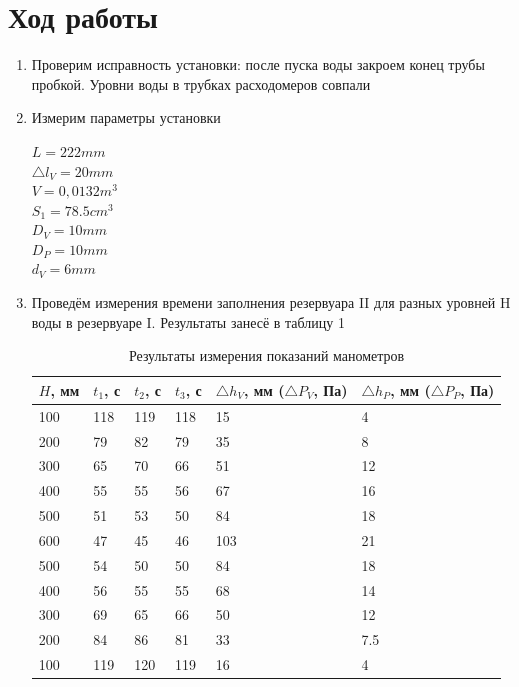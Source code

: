 \documentclass{article}
\begin{document}
\section{Ход работы}
\begin{enumerate}
\item Проверим исправность установки: после пуска воды закроем конец трубы пробкой. Уровни воды в трубках расходомеров совпали
\item Измерим параметры установки
\begin{multicols}{3}
$L = 222 mm$\\
$\triangle l{}_V{} = 20mm$ \\
$V= 0,0132 m^3$\\
$S{}_1{}=78.5 cm^3$\\
$D{}_V{}=10mm$ \\
$D{}_P{}=10mm$ \\
$d{}_V{}=6mm$ \\
\end{multicols}
\item Проведём измерения времени заполнения резервуара II для разных уровней H воды в резервуаре I. Результаты занесё в таблицу 1
\begin{table}[h]
    \centering
    \begin{center}
    \caption{Результаты измерения показаний манометров}
    \end{center}
    \vspace{0.1cm}
    \label{tab:my_label}
   \begin{tabular}{ |p{1.5cm}||p{1cm}|p{1cm}|p{1cm}|p{2cm}|p{2cm}|  }
 \hline
 $H$, мм & $t{}_1{}$, с & $t{}_2{}$, с & $t{}_3{}$, с & $\triangle h{}_V{}$, мм ($\triangle P{}_V{}$, Па) & $\triangle h{}_P{}$, мм ($\triangle P{}_P{}$, Па)  \\
\hline
 
 100 & 118 & 119 & 118 & 15 & 4 \\
 200 & 79 & 82 & 79 & 35 & 8 \\
 300 & 65 & 70 & 66 & 51 & 12\\
 400 & 55 & 55 & 56 & 67 & 16\\
 500 & 51 & 53 & 50 & 84 & 18\\
 600 & 47 & 45 & 46 & 103 & 21\\
 500 & 54 & 50 & 50 & 84 & 18\\
 400 & 56 & 55 & 55 & 68 & 14\\
 300 & 69 & 65 & 66 & 50 & 12\\
 200 & 84 & 86 & 81 & 33 & 7.5\\
 100 & 119 & 120 & 119 & 16 & 4\\
 \hline
\end{tabular}


\end{table}
\end{enumerate}
\end{document}
